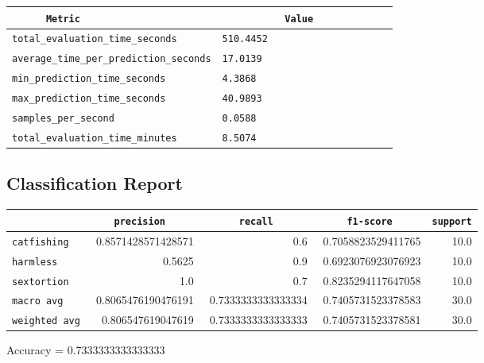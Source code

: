 \documentclass{article}
\begin{document}
\begin{center}
\begin{tabular}{l | l} \hline
    \verb|      Metric     | & \verb|           Value           | \\ \hline
    \hline
    \verb|total_evaluation_time_seconds| & \verb|510.4452                     | \\ \hline
    \verb|average_time_per_prediction_seconds| & \verb|17.0139                      | \\ \hline
    \verb|min_prediction_time_seconds| & \verb|4.3868                       | \\ \hline
    \verb|max_prediction_time_seconds| & \verb|40.9893                      | \\ \hline
    \verb|samples_per_second| & \verb|0.0588                       | \\ \hline
    \verb|total_evaluation_time_minutes| & \verb|8.5074                       | \\ \hline
\end{tabular}
\end{center}

\subsection{Classification Report}

\begin{center}
\begin{tabular}{l | r | r | r | r} \hline
    \verb|            | & \verb|    precision     | & \verb|      recall      | & \verb|     f1-score     | & \verb|support| \\ \hline
    \hline
    \verb|catfishing | & 0.8571428571428571 & 0.6 & 0.7058823529411765 &    10.0 \\ \hline
    \verb|harmless   | & 0.5625 & 0.9 & 0.6923076923076923 &    10.0 \\ \hline
    \verb|sextortion | & 1.0 & 0.7 & 0.8235294117647058 &    10.0 \\ \hline
    \verb|macro avg  | & 0.8065476190476191 & 0.7333333333333334 & 0.7405731523378583 &    30.0 \\ \hline
    \verb|weighted avg| & 0.806547619047619 & 0.7333333333333333 & 0.7405731523378581 &    30.0 \\ \hline
\end{tabular}
\end{center}

\begin{center}
Accuracy = 0.7333333333333333
\end{center}
\end{document}
